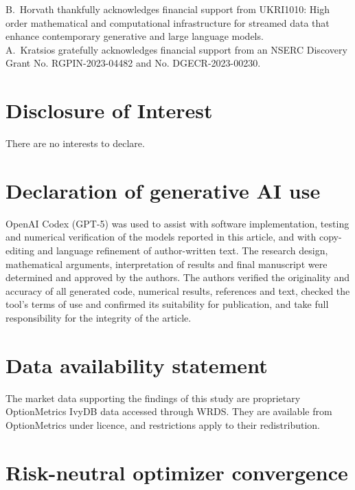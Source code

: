 \documentclass[11pt,a4paper]{article}
\begin{document}
B.~Horvath thankfully acknowledges financial support from UKRI1010: High order mathematical and
computational infrastructure for streamed data that enhance contemporary generative and large language models.\\

\noindent
A.~Kratsios gratefully acknowledges financial support from an NSERC Discovery Grant No. RGPIN-2023-04482 and No. DGECR-2023-00230.

\section*{Disclosure of Interest}

There are no interests to declare.

\section*{Declaration of generative AI use}

OpenAI Codex (GPT-5) was used to assist with software implementation,
testing and numerical verification of the models reported in this article,
and with copy-editing and language refinement of author-written text. The
research design, mathematical arguments, interpretation of results and final
manuscript were determined and approved by the authors. The authors verified
the originality and accuracy of all generated code, numerical results,
references and text, checked the tool's terms of use and confirmed its
suitability for publication, and take full responsibility for the integrity
of the article.

\section*{Data availability statement}

The market data supporting the findings of this study are proprietary
OptionMetrics IvyDB data accessed through WRDS. They are available from
OptionMetrics under licence, and restrictions apply to their redistribution.




\clearpage
\appendix
\section{Risk-neutral optimizer convergence}
\label{app:rn-q2-convergence}
\end{document}

